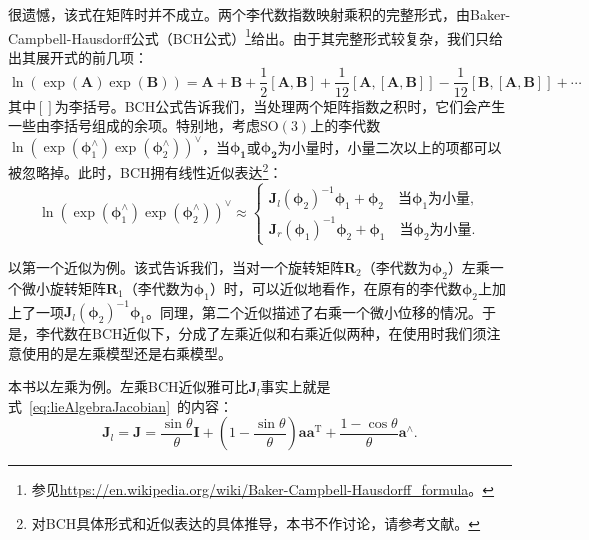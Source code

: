 很遗憾，该式在矩阵时并不成立。两个李代数指数映射乘积的完整形式，由Baker-Campbell-Hausdorff公式（BCH公式）\footnote{ 参见\url{https://en.wikipedia.org/wiki/Baker-Campbell-Hausdorff\_formula}。}给出。由于其完整形式较复杂，我们只给出其展开式的前几项：
\begin{equation}
\ln \left( {\exp \left( \bm{A} \right)\exp \left( \bm{B} \right)} \right) = \bm{A} + \bm{B} + \frac{1}{2}\left[ {\bm{A}, \bm{B}} \right] + \frac{1}{{12}}\left[ {\bm{A},\left[ {\bm{A}, \bm{B}} \right]} \right] - \frac{1}{{12}}\left[ {\bm{B},\left[ {\bm{A},\bm{B}} \right]} \right] +  \cdots 
\end{equation}
其中$[]$为李括号。BCH公式告诉我们，当处理两个矩阵指数之积时，它们会产生一些由李括号组成的余项。特别地，考虑$\mathrm{SO}(3)$上的李代数$\ln { \left( {\exp \left( { \boldsymbol{\phi} _1^ \wedge } \right)\exp \left( {\boldsymbol{\phi} _2^ \wedge } \right)} \right) ^ \vee }$，当$\boldsymbol{\phi_1}$或$\boldsymbol{\phi_2}$为小量时，小量二次以上的项都可以被忽略掉。此时，BCH拥有线性近似表达\footnote{对BCH具体形式和近似表达的具体推导，本书不作讨论，请参考文献\cite{Barfoot2016}。}：
\begin{equation}
 \ln { \left( {\exp \left( { \boldsymbol{\phi} _1^ \wedge } \right)\exp \left( {\boldsymbol{\phi} _2^ \wedge } \right)} \right) ^ \vee } \approx \left\{ 
 \begin{array}{l}
 {\bm{J}_l}{\left( {{\boldsymbol{\phi} _2}} \right)^{ - 1}}{ \boldsymbol{\phi} _1} + {\boldsymbol{\phi} _2} \quad \text{当} \boldsymbol{\phi}_1 \text{为小量},\\
 {\bm{J}_r}{\left( {{\boldsymbol{\phi} _1}} \right)^{ - 1}}{\boldsymbol{\phi} _2} + {\boldsymbol{\phi} _1} \quad \text{当} \boldsymbol{\phi}_2 \text{为小量}.
 \end{array} \right.
\end{equation}

以第一个近似为例。该式告诉我们，当对一个旋转矩阵$\bm{R}_2$（李代数为$\boldsymbol{\phi}_2$）左乘一个微小旋转矩阵$\bm{R}_1$（李代数为$\boldsymbol{\phi} _1$）时，可以近似地看作，在原有的李代数$\boldsymbol{\phi}_2$上加上了一项${\bm{J}_l}{\left( {{\boldsymbol{\phi} _2}} \right)^{ - 1}}{ \boldsymbol{\phi} _1}$。同理，第二个近似描述了右乘一个微小位移的情况。于是，李代数在BCH近似下，分成了左乘近似和右乘近似两种，在使用时我们须注意使用的是左乘模型还是右乘模型。

本书以左乘为例。左乘BCH近似雅可比$\bm{J}_l$事实上就是式~\eqref{eq:lieAlgebraJacobian}~的内容：
\begin{equation} 
{ \bm{J}_l} = \bm{J} = \frac{{\sin \theta }}{\theta } \bm{I} + \left( {1 - \frac{{\sin \theta }}{\theta }} \right) \bm{a} { \bm{a}^\mathrm{T}} + \frac{{1 - \cos \theta }}{\theta }{ \bm{a}^ \wedge}.
\end{equation}


